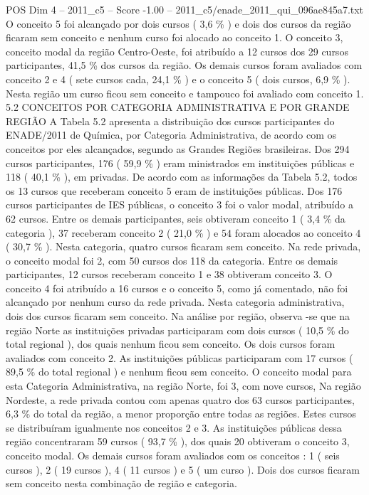 \begin{textsample}{POS Dim 4 – 2011\_c5 – Score -1.00 – 2011\_c5/enade\_2011\_qui\_096ae845a7.txt}
O conceito 5 foi alcançado por dois cursos ( 3,6 \% ) e dois dos cursos da região ficaram sem conceito e nenhum curso foi alocado ao conceito 1.
O conceito 3, conceito modal da região Centro-Oeste, foi atribuído a 12 cursos dos 29 cursos participantes, 41,5 \% dos cursos da região.
Os demais cursos foram avaliados com conceito 2 e 4 ( sete cursos cada, 24,1 \% ) e o conceito 5 ( dois cursos, 6,9 \% ).
Nesta região um curso ficou sem conceito e tampouco foi avaliado com conceito 1. 5.2 CONCEITOS POR CATEGORIA ADMINISTRATIVA E POR GRANDE REGIÃO A Tabela 5.2 apresenta a distribuição dos cursos participantes do ENADE/2011 de Química, por Categoria Administrativa, de acordo com os conceitos por eles alcançados, segundo as Grandes Regiões brasileiras.
Dos 294 cursos participantes, 176 ( 59,9 \% ) eram ministrados em instituições públicas e 118 ( 40,1 \% ), em privadas.
De acordo com as informações da Tabela 5.2, todos os 13 cursos que receberam conceito 5 eram de instituições públicas.
Dos 176 cursos participantes de IES públicas, o conceito 3 foi o valor modal, atribuído a 62 cursos.
Entre os demais participantes, seis obtiveram conceito 1 ( 3,4 \% da categoria ), 37 receberam conceito 2 ( 21,0 \% ) e 54 foram alocados ao conceito 4 ( 30,7 \% ).
Nesta categoria, quatro cursos ficaram sem conceito.
Na rede privada, o conceito modal foi 2, com 50 cursos dos 118 da categoria.
Entre os demais participantes, 12 cursos receberam conceito 1 e 38 obtiveram conceito 3.
O conceito 4 foi atribuído a 16 cursos e o conceito 5, como já comentado, não foi alcançado por nenhum curso da rede privada.
Nesta categoria administrativa, dois dos cursos ficaram sem conceito.
Na análise por região, observa -se que na região Norte as instituições privadas participaram com dois cursos ( 10,5 \% do total regional ), dos quais nenhum ficou sem conceito.
Os dois cursos foram avaliados com conceito 2.
As instituições públicas participaram com 17 cursos ( 89,5 \% do total regional ) e nenhum ficou sem conceito.
O conceito modal para esta Categoria Administrativa, na região Norte, foi 3, com nove cursos, Na região Nordeste, a rede privada contou com apenas quatro dos 63 cursos participantes, 6,3 \% do total da região, a menor proporção entre todas as regiões.
Estes cursos se distribuíram igualmente nos conceitos 2 e 3.
As instituições públicas dessa região concentraram 59 cursos ( 93,7 \% ), dos quais 20 obtiveram o conceito 3, conceito modal.
Os demais cursos foram avaliados com os conceitos : 1 ( seis cursos ), 2 ( 19 cursos ), 4 ( 11 cursos ) e 5 ( um curso ).
Dois dos cursos ficaram sem conceito nesta combinação de região e categoria.

\end{textsample}
